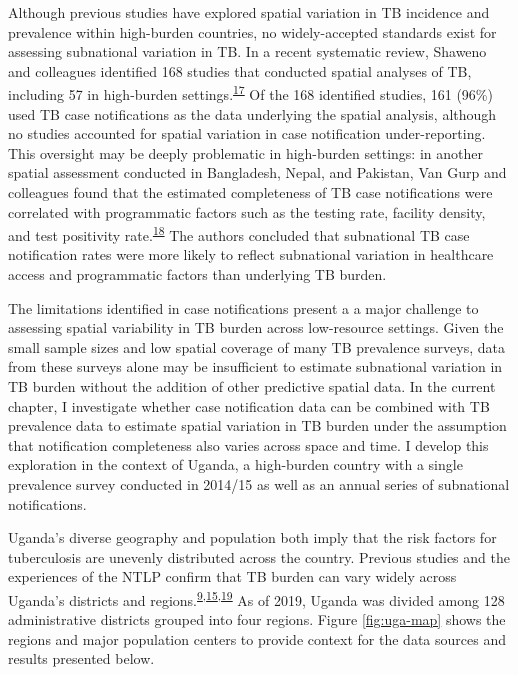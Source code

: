 \documentclass[
]{article}
\begin{document}
Although previous studies have explored spatial variation in TB incidence and prevalence within high-burden countries, no widely-accepted standards exist for assessing subnational variation in TB. In a recent systematic review, Shaweno and colleagues identified 168 studies that conducted spatial analyses of TB, including 57 in high-burden settings.\textsuperscript{\protect\hyperlink{ref-Shaweno2018}{17}} Of the 168 identified studies, 161 (96\%) used TB case notifications as the data underlying the spatial analysis, although no studies accounted for spatial variation in case notification under-reporting. This oversight may be deeply problematic in high-burden settings: in another spatial assessment conducted in Bangladesh, Nepal, and Pakistan, Van Gurp and colleagues found that the estimated completeness of TB case notifications were correlated with programmatic factors such as the testing rate, facility density, and test positivity rate.\textsuperscript{\protect\hyperlink{ref-VanGurp2020}{18}} The authors concluded that subnational TB case notification rates were more likely to reflect subnational variation in healthcare access and programmatic factors than underlying TB burden.

The limitations identified in case notifications present a a major challenge to assessing spatial variability in TB burden across low-resource settings. Given the small sample sizes and low spatial coverage of many TB prevalence surveys, data from these surveys alone may be insufficient to estimate subnational variation in TB burden without the addition of other predictive spatial data. In the current chapter, I investigate whether case notification data can be combined with TB prevalence data to estimate spatial variation in TB burden under the assumption that notification completeness also varies across space and time. I develop this exploration in the context of Uganda, a high-burden country with a single prevalence survey conducted in 2014/15 as well as an annual series of subnational notifications.

Uganda's diverse geography and population both imply that the risk factors for tuberculosis are unevenly distributed across the country. Previous studies and the experiences of the NTLP confirm that TB burden can vary widely across Uganda's districts and regions.\textsuperscript{\protect\hyperlink{ref-UgandaNationalTuberculosisandLeprosyProgramme2017a}{9},\protect\hyperlink{ref-Karamagi2018}{15},\protect\hyperlink{ref-Kirirabwa2019}{19}} As of 2019, Uganda was divided among 128 administrative districts grouped into four regions. Figure \ref{fig:uga-map} shows the regions and major population centers to provide context for the data sources and results presented below.
\end{document}
